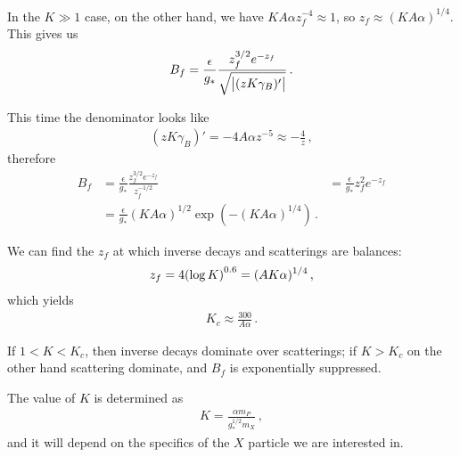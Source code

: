 \documentclass[main.tex]{subfiles}
\begin{document}
In the \(K \gg 1\) case, on the other hand, we have \(K A \alpha z_f^{-4} \approx 1\), so \(z_f \approx (K A \alpha )^{1/4}\). This gives us 
%
\begin{align}
B_f = \frac{\epsilon}{g_*} \frac{z_f^{3/2} e^{-z_f}}{\sqrt{\abs{(zK \gamma _B)'}}}
\,.
\end{align}

This time the denominator looks like 
%
\begin{align}
(zK \gamma _B)' = -4 A \alpha z^{-5} \approx - \frac{4}{z}
\,,
\end{align}
%
therefore 
%
\begin{align}
B_f &= \frac{\epsilon}{g_*} \frac{z_f^{3/2} e^{-z_f}}{z_f^{-1/2}}
&= \frac{\epsilon}{g_*} z_f^2 e^{-z_f}  \\
&= \frac{\epsilon}{g_*} (K A \alpha )^{1/2} \exp(- (K A \alpha )^{1/4})
\,.
\end{align}

We can find the \(z_f\) at which inverse decays and scatterings are balances: 
%
\begin{align}
z_f = 4 \qty(\log K)^{\num{.6}} = (A K \alpha )^{1/4}
\,,
\end{align}
%
which yields 
%
\begin{align}
K_c \approx \frac{300}{A \alpha }
\,.
\end{align}

If \(1 < K < K_c\), then inverse decays dominate over scatterings; if \(K > K_c\) on the other hand scattering dominate, and \(B_f\) is exponentially suppressed. 

The value of \(K\) is determined as 
%
\begin{align}
K = \frac{\alpha m_P}{g_*^{1/2} m_X}
\,,
\end{align}
%
and it will depend on the specifics of the \(X\) particle we are interested in. 
\end{document}
